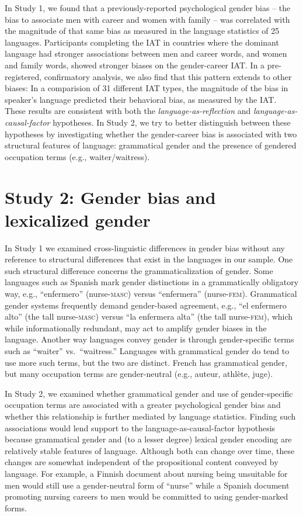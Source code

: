 \documentclass[man,floatsintext]{apa6}
\begin{document}
In Study 1, we found that a previously-reported psychological gender bias -- the bias to associate men with career and women with family -- was correlated with the magnitude of that same bias as measured in the language statistics of 25 languages. Participants completing the IAT in countries where the dominant language had stronger associations between men and career words, and women and family words, showed stronger biases on the gender-career IAT. In a pre-registered, confirmatory analysis, we also find that this pattern extends to other biases: In a comparision of 31 different IAT types, the magnitude of the bias in speaker's language predicted their behavioral bias, as measured by the IAT. These results are consistent with both the \emph{language-as-reflection} and \emph{language-as-causal-factor} hypotheses. In Study 2, we try to better distinguish between these hypotheses by investigating whether the gender-career bias is associated with two structural features of language: grammatical gender and the presence of gendered occupation terms (e.g., waiter/waitress).

\hypertarget{study-2-gender-bias-and-lexicalized-gender}{%
\section{Study 2: Gender bias and lexicalized gender}\label{study-2-gender-bias-and-lexicalized-gender}}

In Study 1 we examined cross-linguistic differences in gender bias without any reference to structural differences that exist in the languages in our sample. One such structural difference concerns the grammaticalization of gender. Some languages such as Spanish mark gender distinctions in a grammatically obligatory way, e.g., \enquote{enfermero} (nurse-\textsc{masc}) versus \enquote{enfermera} (nurse-\textsc{fem}). Grammatical gender systems frequently demand gender-based agreement, e.g., \enquote{el enfermero alto} (the tall nurse-\textsc{masc}) versus \enquote{la enfermera alta} (the tall nurse-\textsc{fem}), which while informationally redundant, may act to amplify gender biases in the language. Another way languages convey gender is through gender-specific terms such as \enquote{waiter} vs.~\enquote{waitress.} Languages with grammatical gender do tend to use more such terms, but the two are distinct. French has grammatical gender, but many occupation terms are gender-neutral (e.g., auteur, athlète, juge).

In Study 2, we examined whether grammatical gender and use of gender-specific occupation terms are associated with a greater psychological gender bias and whether this relationship is further mediated by language statistics. Finding such associations would lend support to the language-as-causal-factor hypothesis because grammatical gender and (to a lesser degree) lexical gender encoding are relatively stable features of language. Although both can change over time, these changes are somewhat independent of the propositional content conveyed by language. For example, a Finnish document about nursing being unsuitable for men would still use a gender-neutral form of \enquote{nurse} while a Spanish document promoting nursing careers to men would be committed to using gender-marked forms.
\end{document}
